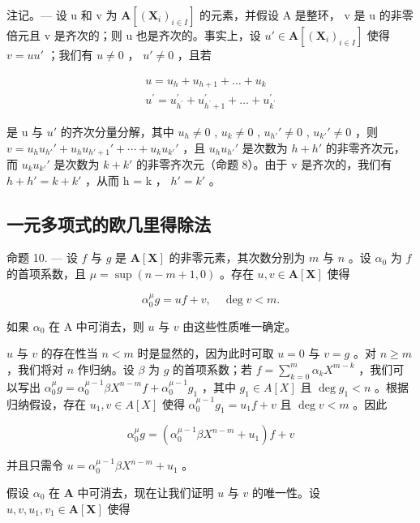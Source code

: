 注记。--- 设 u 和 v 为 \(\mathbf{A}[(\mathbf{X}_{i})_{i\in I}]\) 的元素，并假设 A 是整环， v 是 u 的非零倍元且 v 是齐次的；则 u 也是齐次的。事实上，设 \(u'\in\mathbf{A}[(\mathbf{X}_{i})_{i\in I}]\) 使得 \(v=uu'\) ；我们有 \(u\neq0\) ， \(u'\neq0\) ，且若

\[
\begin{array}{c} u = u _ {h} + u _ {h + 1} + \dots + u _ {k} \\ u ^ {\prime} = u _ {h ^ {\prime}} ^ {\prime} + u _ {h ^ {\prime} + 1} ^ {\prime} + \dots + u _ {k ^ {\prime}} ^ {\prime} \end{array}
\]

是 u 与 \(u'\) 的齐次分量分解，其中 \(u_{h} \neq 0\) , \(u_{k} \neq 0\) , \(u_{h'}' \neq 0\) , \(u_{k'}' \neq 0\) ，则 \(v = u_{h} u_{h'}' + u_{h} u_{h'+1}' + \cdots + u_{k} u_{k'}'\) ，且 \(u_{h} u_{h'}'\) 是次数为 \(h + h'\) 的非零齐次元，而 \(u_{k} u_{k'}'\) 是次数为 \(k + k'\) 的非零齐次元（命题 8）。由于 v 是齐次的，我们有 \(h + h' = k + k'\) ，从而 h = k ， \(h' = k'\) 。

\subsection{一元多项式的欧几里得除法}

命题 10. --- 设 \(f\) 与 \(g\) 是 \(\mathbf{A}[\mathbf{X}]\) 的非零元素，其次数分别为 \(m\) 与 \(n\) 。设 \(\alpha_0\) 为 \(f\) 的首项系数，且 \(\mu = \sup (n - m + 1, 0)\) 。存在 \(u, v \in \mathbf{A}[\mathbf{X}]\) 使得

\[
\alpha_ {0} ^ {\mu} g = u f + v, \quad \deg v <   m.
\]

如果 \(\alpha_0\) 在 A 中可消去，则 \(u\) 与 \(v\) 由这些性质唯一确定。

\(u\) 与 \(v\) 的存在性当 \(n < m\) 时是显然的，因为此时可取 \(u = 0\) 与 \(v = g\) 。对 \(n \geqslant m\) ，我们将对 \(n\) 作归纳。设 \(\beta\) 为 \(g\) 的首项系数；若 \(f = \sum_{k=0}^{m} \alpha_k X^{m-k}\) ，我们可以写出 \(\alpha_0^\mu g = \alpha_0^{\mu-1} \beta X^{n-m} f + \alpha_0^{\mu-1} g_1\) ，其中 \(g_1 \in A[X]\) 且 \(\deg g_1 < n\) 。根据归纳假设，存在 \(u_1, v \in A[X]\) 使得 \(\alpha_0^{\mu-1} g_1 = u_1 f + v\) 且 \(\deg v < m\) 。因此

\[
\alpha_ {0} ^ {\mu} g = \left(\alpha_ {0} ^ {\mu - 1} \beta X ^ {n - m} + u _ {1}\right) f + v
\]

并且只需令 \(u = \alpha_0^{\mu - 1}\beta X^{n - m} + u_1\) 。

假设 \(\alpha_0\) 在 \(\mathbf{A}\) 中可消去，现在让我们证明 \(u\) 与 \(v\) 的唯一性。设 \(u, v, u_1, v_1 \in \mathbf{A}[\mathbf{X}]\) 使得

